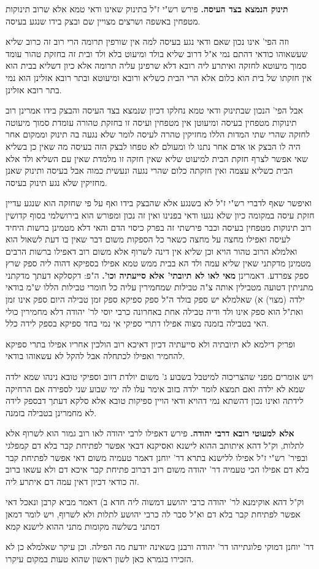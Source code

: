 \documentclass[12pt, openany]{book}
\newcommand{\sethebfont}{
\fontsize{10.5pt}{21.0pt} \selectfont
}
\newcommand{\twocol}[1]{
	{\sethebfont \begin{multicols}{2}
			#1
	\end{multicols}}	
}
\begin{document}
\twocol{\textbf{תינוק הנמצא בצד העיסה.}  פירש רש"י ז"ל בתינוק שאינו ודאי טמא אלא שרוב תינוקות מטפחין באשפה ושרצים מצויין שם ובצק בידו שנגע בעיסה.\par  וזה הפי' אינו נכון שאם ודאי נגע בעיסה למה אין שורפין תרומה הרי רוב זה כרוב שליא שעשאוהו כודאי דהתם נמי א"ל דרוב שליא בולד ומיעוט בלא ולד ובית זה בחזקת טהור עומד סמוך מיעוטא לחזקה ואיתרע ליה רובא דלא שרפינן עליה תרומה אלא כיון דשליא בבית הוא אין חזקתו של בית הוא כלום אלא הרי הבית כשליא ורובא ומיעוטא ובתר רובא אזלינן הוא נמי בתר רובא אזלינן.\par  אבל הפי' הנכון שבתינוק ודאי טמא נחלקו דכיון שנמצא בצד העיסה והבצק בידו אמרינן רוב תינוקות מטפחין בעיסה ומיעוטן אין מטפחין ועיסה זו בחזקת טהורה עומדת סמוך מיעוטה לחזקה שהרי שתי המדות הללו מחזיקין טהרה לעיסה לומר שלא נגעה בה תינוק וממקום אחר היה לו הבצק או אדם אחר נתנו לו ומעולם לא טפחו לבצק הזה בעיסה מה שאין כן בשליא שאי אפשר לצרף חזקת הבית למיעוט שליא שאין חזקה זו מלמדת שאין עם השליא ולד אלא הבית כשליא עצמה ואין חזקתה כלום שהרי נגעה ונעשית כמוה אבל בעיסה ותינוק שאנן מחזיקין שלא נגע תינוק בעיסה.\par ואיפשר שאף לדברי רש"י ז"ל לא בשנגע אלא שהבצק בידו ואף על פי שחזקה הוא שנגע עדיין חזקת עיסה במקומה כיון שלא נגעו ודאי בפנינו ואין זה נכון ומפורש הוא בירושלמי בסוף קדושין רוב תינוקות מטפחין בעיסה וכבר פירשתי זה בפרק כיסוי הדם והאי דלא מטמינן ברשות היחיד לעיסה ואפילו מחצה על מחצה כשאר כל הספקות משום דבר שאין בו דעת לשאול הוא ואלמלא הרוב טהור הויא וכן שליא אין דינה לשרוף אלא משום רוב דאפילו ברשות הרבים מטמינן מדקתני שאין שליא עמה ולד הא בבית ממש טמא אפילו בספיקא דהוה ליה ספק שרץ ספק צפרדע. 
\parהא דאמרינן \textbf{מאי לאו לא תיובתי' אלא סייעתיה וכו'.}  ה"פ: דקסלקא דעתך מדקתני מתניתין דטועה מטבילין אותה צ"ה טבילות שמחמירין עליה כל חומרי טבילות הללו ש"מ בודאי ילדה (מצוי) א) שאלמלא יש ספק בולד ה"ל ספק ספיקא ספק זמן טבילה היום ספק אינו זמן ואת"ל הוא ספק אינו ולד ודיה טבילה אחת באחרונה כרבי יוסי לר' יהודה דלא מחמירין כולי האי בטבילה בזמנה מצוה אפילו דתרי ספיקי אי נמי בחד ספיקא בספק לידה כלל.\par ופריק דילמא לא תיובתיה ולא סייעתיה דכיון דאיכא רוב הולכין אחריו אפילו בתרי ספיקא להחמיר ואפילו לכתחלה אבל להקל לא עשאוהו בודאי.\par ויש אומרים מפני שהצריכוה למיטבל בשבוע ג' משום יולדת דזוב וספיקי טובא נינהו שמא ילדה שמא לא ילדה ואם תמצא לומר ילדה בזוב אימר עלו לה ימי שבוע שני לספירה אם הרחיקה לידתה ואינו נכון דהשתא נמי דהויא ודאי הויין ספיקות טובא אלא סלקא דעתך דבספק לידה לא מחמרינן בטבילה בזמנה. 
\par\textbf{אלא למעוטי רובא דרבי יהודה.}  פירש דאפילו לרבי יהודה לאו רוב גמור הוא לשרוף אלא לתלות, וק"ל דהא איתותב ההוא לישנא ואסיקנא דבאי אפשר לפתיחת קבר בלא דם קמפלגי ובפיר' רש"י ז"ל אפילו ללישנא בתרא דר' יוחנן דאמר טעמיה משום דאי אפשר לפתיחת קבר בלא דם אפילו הכי טעמיה דר' יהודה משום רוב דברוב פתיחת קבר איכא דם ולא עשאו ברוב זה כודאי דכיון דאין עמה דם איתרע ליה.\par  וק"ל דהא אוקימנא לר' יהודה כרבי יהושע דמשוה ליה חדא ב) דאמר מביא קרבן ונאכל דאי אפשר לפתיחת קבר בלא דם וא"ל סבר לה כרבי יהושע לתלות ולא לשרוף, ויש לומר דמאן דמתני בשלשה מקומות מתני ההוא לישנא קמא\par  דר' יוחנן דמוקי פלוגתייהו דר' יהודה ורבנן בשאינה יודעת מה הפילה. וכן עיקר שאלמלא כן לא הזכירו בגמרא כאן לשון ראשון שהוא טעות במקום עיקרו. 
\par}
\end{document}
